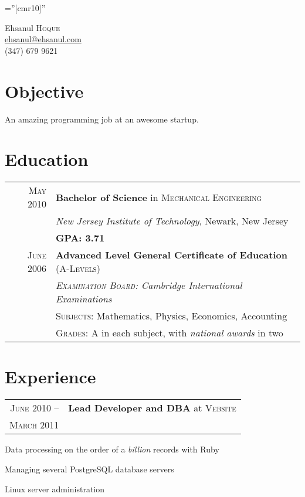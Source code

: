 \documentclass[a4paper,10pt]{article}
\newenvironment{packed-list}{
  \begin{itemize}[itemsep=1pt,partopsep=0pt]
    \setlength{\parskip}{0pt}
    \setlength{\partopsep}{9pt}
    \setlength{\parsep}{0pt}
    \setlength{\topsep}{0pt}
} {\end{itemize}}
\begin{document}
\pagestyle{empty} %

\font\fb=''[cmr10]'' %

\par{\centering
      {\huge Ehsanul \textsc{Hoque}}\\
      {\Large \href{mailto:ehsanul@ehsanul.com}{ehsanul@ehsanul.com}}\\
      {\large (347) 679 9621}
\vspace{-5pt}\par}

\section{Objective}
{\fontsize{12}{14}\selectfont  An amazing programming job at an awesome startup.}

\section{Education}
\begin{tabular}{rl}	
  \textsc{May} 2010 
    & {\bf Bachelor of Science} in \textsc{Mechanical Engineering}\\
    & {\it New Jersey Institute of Technology}, Newark, New Jersey\\
    & {\bf GPA: 3.71}\vspace{3pt}\\
  \textsc{June} 2006 
    & {\bf Advanced Level General Certificate of Education } \textsc{(A-Levels)}\\
    & \emph{\textsc{Examination Board}: Cambridge International Examinations}\\
    & \textsc{Subjects}: Mathematics, Physics, Economics, Accounting\\
    & \textsc{Grades}: A in each subject, with {\em national awards} in two\\
\end{tabular}

\section{Experience}
\begin{tabular}{rl}
  \textsc{June 2010 –}
    & \textbf{Lead Developer and DBA} at \textsc{Vebsite}\\
   \textsc{March 2011}
\end{tabular}
\vspace{-15pt}
\begin{packed-list}
    \item{Data processing on the order of a {\em billion} records} with Ruby
    \item{Managing several PostgreSQL database servers}
    \item{Linux server administration}
  \end{packed-list}
\end{document}
